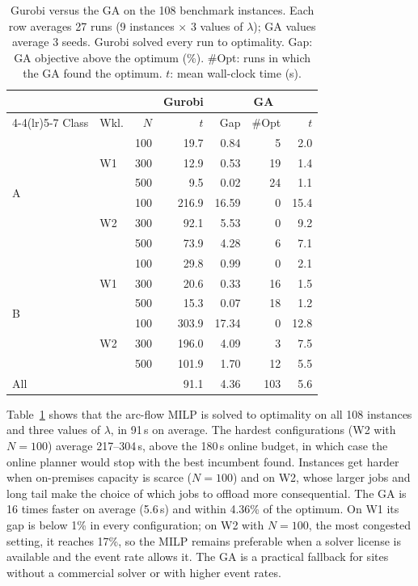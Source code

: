 \documentclass[conference]{IEEEtran}
\begin{document}
\begin{table}[t]
\centering\footnotesize
\setlength{\tabcolsep}{4pt}
\caption{Gurobi versus the GA on the 108 benchmark instances. Each row averages 27 runs (9 instances $\times$ 3 values of $\lambda$); GA values average 3 seeds. Gurobi solved every run to optimality. Gap: GA objective above the optimum (\%). \#Opt: runs in which the GA found the optimum. $t$: mean wall-clock time (s).}
\label{tab:ga-vs-gurobi}
\begin{tabular}{llrrrrr}
\toprule
 & & & Gurobi & \multicolumn{3}{c}{GA} \\
\cmidrule(lr){4-4}\cmidrule(lr){5-7}
Class & Wkl. & $N$ & $t$ & Gap & \#Opt & $t$ \\
\midrule
\multirow{6}{*}{A} & \multirow{3}{*}{W1} & 100 & 19.7 & 0.84 & 5 & 2.0 \\
 & & 300 & 12.9 & 0.53 & 19 & 1.4 \\
 & & 500 & 9.5 & 0.02 & 24 & 1.1 \\
\cmidrule(lr){2-7}
 & \multirow{3}{*}{W2} & 100 & 216.9 & 16.59 & 0 & 15.4 \\
 & & 300 & 92.1 & 5.53 & 0 & 9.2 \\
 & & 500 & 73.9 & 4.28 & 6 & 7.1 \\
\midrule
\multirow{6}{*}{B} & \multirow{3}{*}{W1} & 100 & 29.8 & 0.99 & 0 & 2.1 \\
 & & 300 & 20.6 & 0.33 & 16 & 1.5 \\
 & & 500 & 15.3 & 0.07 & 18 & 1.2 \\
\cmidrule(lr){2-7}
 & \multirow{3}{*}{W2} & 100 & 303.9 & 17.34 & 0 & 12.8 \\
 & & 300 & 196.0 & 4.09 & 3 & 7.5 \\
 & & 500 & 101.9 & 1.70 & 12 & 5.5 \\
\midrule
\multicolumn{3}{l}{All} & 91.1 & 4.36 & 103 & 5.6 \\
\bottomrule
\end{tabular}
\end{table}

Table~\ref{tab:ga-vs-gurobi} shows that the arc-flow MILP is solved to optimality on all 108 instances and three values of $\lambda$, in 91\,s on average. The hardest configurations (W2 with $N=100$) average 217--304\,s, above the 180\,s online budget, in which case the online planner would stop with the best incumbent found. Instances get harder when on-premises capacity is scarce ($N=100$) and on W2, whose larger jobs and long tail make the choice of which jobs to offload more consequential. The GA is 16 times faster on average (5.6\,s) and within 4.36\% of the optimum. On W1 its gap is below 1\% in every configuration; on W2 with $N=100$, the most congested setting, it reaches 17\%, so the MILP remains preferable when a solver license is available and the event rate allows it. The GA is a practical fallback for sites without a commercial solver or with higher event rates.
\end{document}
